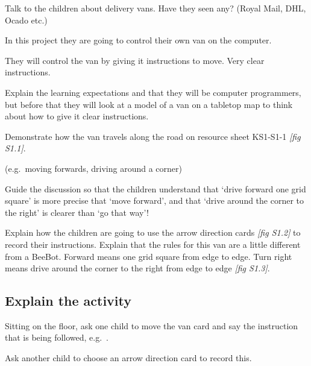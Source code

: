\documentclass{../../../lessonplan}
\begin{document}
\begin{lessonplan}

Talk to the children about delivery vans.
Have they seen any? (Royal Mail, DHL, Ocado etc.)

In this project they are going to control their own van on the computer.

They will control the van by giving it instructions to move.
Very clear instructions.

Explain the learning expectations and that they will be computer programmers, but before that they will look at a model of a van on a tabletop map to think about how to give it clear instructions.

Demonstrate how the van travels along the road on resource sheet KS1-S1-1 \textit{[fig S1.1]}.


 (e.g.\ moving forwards, driving around a corner)



Guide the discussion so that the children understand that `drive forward one grid square' is more precise that `move forward', and that `drive around the corner to the right' is clearer than `go that way'!


Explain how the children are going to use the arrow direction cards \textit{[fig S1.2]} to record their instructions.
Explain that the rules for this van are a little different from a BeeBot.
Forward means one grid square from edge to edge.
Turn right means drive around the corner to the right from edge to edge \textit{[fig S1.3]}.




\subsection*{Explain the activity}

Sitting on the floor, ask one child to move the van card and say the instruction that is being followed, e.g.\ .

Ask another child to choose an arrow direction card to record this.


\end{lessonplan}
\end{document}
